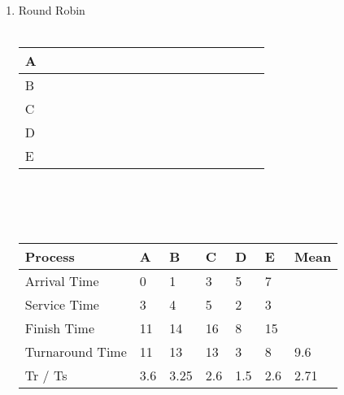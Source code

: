 \documentclass[12pt]{article}
\begin{document}
\begin{enumerate}
   	\begin{enumerate}
   		\item Round Robin \\ \\
\begin{tabular}{|l|l|l|l|l|l|l|l|l|l|l|l|l|l|l|l|l|l|}
\hline
A & \cellcolor[HTML]{32CB00} &  & \cellcolor[HTML]{32CB00}{\color[HTML]{32CB00} } &  &  &  &  &  &  &  &  & \cellcolor[HTML]{32CB00}{\color[HTML]{32CB00} } & {\color[HTML]{32CB00} } &  &  &  &  \\ \hline
B &  & \cellcolor[HTML]{32CB00} & \cellcolor[HTML]{FFFFFF} &  & \cellcolor[HTML]{32CB00} &  &  &  &  &  & \cellcolor[HTML]{32CB00}{\color[HTML]{32CB00} } &  &  &  & \cellcolor[HTML]{32CB00} &  &  \\ \hline
C &  &  &  & \cellcolor[HTML]{32CB00}{\color[HTML]{32CB00} } &  &  & \cellcolor[HTML]{32CB00} &  &  & \cellcolor[HTML]{32CB00} &  &  &  & \cellcolor[HTML]{32CB00} &  &  & \cellcolor[HTML]{32CB00}{\color[HTML]{32CB00} } \\ \hline
D &  &  &  &  &  & \cellcolor[HTML]{32CB00}{\color[HTML]{32CB00} } &  &  & \cellcolor[HTML]{32CB00} &  &  &  &  &  &  &  &  \\ \hline
E &  &  &  &  &  &  &  & \cellcolor[HTML]{32CB00} &  &  &  &  & \cellcolor[HTML]{32CB00} &  &  & \cellcolor[HTML]{32CB00} &  \\ \hline
\end{tabular} \\ \\ \\
\begin{tabular}{|l|l|l|l|l|l|l|}
\hline
Process & A & B & C & D & E & Mean \\ \hline
Arrival Time & 0 & 1 & 3 & 5 & 7 &  \\ \hline
Service Time & 3 & 4 & 5 & 2 & 3 &  \\ \hline
Finish Time & 11 & 14 & 16 & 8 & 15 &  \\ \hline
Turnaround Time & 11 & 13 & 13 & 3 & 8 & 9.6 \\ \hline
Tr / Ts & 3.6 & 3.25 & 2.6 & 1.5 & 2.6 & 2.71 \\ \hline
\end{tabular}
	\\ \\
	

\end{enumerate}
\end{enumerate}
\end{document}

